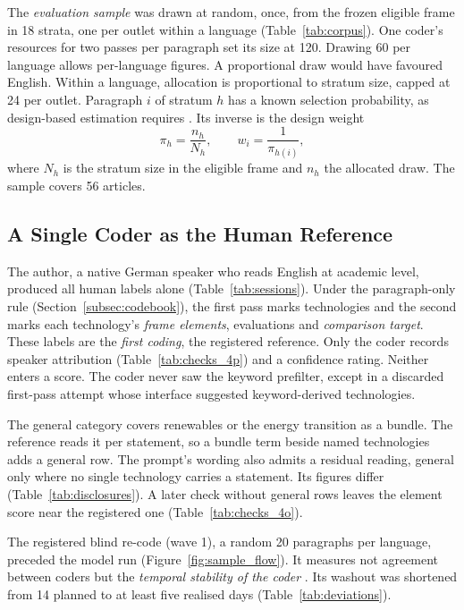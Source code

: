 The \emph{evaluation sample} was drawn at random, once, from the frozen eligible frame in 18 strata, one per outlet within a language (Table~\ref{tab:corpus}). One coder's resources for two passes per paragraph set its size at 120. Drawing 60 per language allows per-language figures. A proportional draw would have favoured English. Within a language, allocation is proportional to stratum size, capped at 24 per outlet. Paragraph $i$ of stratum $h$ has a known selection probability, as design-based estimation requires \parencite{egami2023dsl}. Its inverse is the design weight \parencite[p.~669]{horvitz1952generalization}
\begin{equation}
\pi_h = \frac{n_h}{N_h}, \qquad w_i = \frac{1}{\pi_{h(i)}},
\label{eq:weights}
\end{equation}
where $N_h$ is the stratum size in the eligible frame and $n_h$ the allocated draw. The sample covers 56 articles.



\subsection{A Single Coder as the Human Reference}\label{subsec:annotation}

The author, a native German speaker who reads English at academic level, produced all human labels alone (Table~\ref{tab:sessions}). Under the paragraph-only rule (Section~\ref{subsec:codebook}), the first pass marks technologies and the second marks each technology's \emph{frame elements}, evaluations and \emph{comparison target}. These labels are the \emph{first coding}, the registered reference. Only the coder records speaker attribution (Table~\ref{tab:checks_4p}) and a confidence rating. Neither enters a score. The coder never saw the keyword prefilter, except in a discarded first-pass attempt whose interface suggested keyword-derived technologies.

The general category covers renewables or the energy transition as a bundle. The reference reads it per statement, so a bundle term beside named technologies adds a general row. The prompt's wording also admits a residual reading, general only where no single technology carries a statement. Its figures differ (Table~\ref{tab:disclosures}). A later check without general rows leaves the element score near the registered one (Table~\ref{tab:checks_4o}).

The registered blind re-code (wave 1), a random 20 paragraphs per language, preceded the model run (Figure~\ref{fig:sample_flow}). It measures not agreement between coders but the \emph{temporal stability of the coder} \parencite[p.~215]{krippendorff2004contentanalysis}. Its washout was shortened from 14 planned to at least five realised days (Table~\ref{tab:deviations}).

